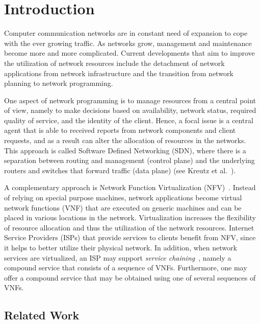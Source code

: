 \documentclass[11pt]{article}
\begin{document}

\section{Introduction}


Computer communication networks are in constant need of expansion to
cope with the ever growing traffic.  As networks grow, management and
maintenance become more and more complicated.
%
Current developments that aim to improve the utilization of network
resources include the detachment of network applications from network
infrastructure and the transition from network planning to network
programming.

One aspect of network programming is to manage resources from a
central point of view, namely to make decisions based on availability,
network status, required quality of service, and the identity of the
client.  Hence, a focal issue is a central agent that is able to
received reports from network components and client requests, and as a
result can alter the allocation of resources in the networks.  This
approach is called Software Defined Networking (SDN), where there is a
separation between routing and management (control plane) and the
underlying routers and switches that forward traffic (data plane) (see
Kreutz et al.~\cite{KRVRAU15}).

A complementary approach is Network Function Virtualization
(NFV)~\cite{NFV12}.  Instead of relying on special purpose machines,
network applications become virtual network functions (VNF) that are
executed on generic machines and can be placed in various locations in
the network.  Virtualization increases the flexibility of resource
allocation and thus the utilization of the network resources.
%
Internet Service Providers (ISPs) that provide services to clients
benefit from NFV, since it helps to better utilize their physical
network.  In addition, when network services are virtualized, an ISP
may support \emph{service chaining}~\cite{ServiceChaining15}, namely a
compound service that consists of a sequence of VNFs.  Furthermore,
one may offer a compound service that may be obtained using one of
several sequences of VNFs.


\subsection{Related Work}
\end{document}
